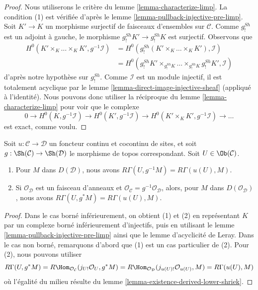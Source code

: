 \begin{proof}
Nous utiliserons le critère du lemme \ref{lemma-characterize-limp}.
La condition (1) est vérifiée d'après le
lemme \ref{lemma-pullback-injective-pre-limp}.
Soit $K' \to K$ un morphisme surjectif de faisceaux d'ensembles sur
$\mathcal{C}$. Comme $g_!^{Sh}$ est un adjoint à gauche, le morphisme
$g_!^{Sh}K' \to g_!^{Sh}K$ est surjectif. Observons que
\begin{align*}
H^0(K' \times_K \ldots \times_K K', g^{-1}\mathcal{I}) 
& =
H^0(g_!^{Sh}(K' \times_K \ldots \times_K K'), \mathcal{I}) \\
& =
H^0(g_!^{Sh}K' \times_{g_!^{Sh}K} \ldots \times_{g_!^{Sh}K} g_!^{Sh}K',
\mathcal{I})
\end{align*}
d'après notre hypothèse sur $g_!^{Sh}$. Comme $\mathcal{I}$ est un module
injectif, il est totalement acyclique par le
lemme \ref{lemma-direct-image-injective-sheaf} (appliqué à l'identité).
Nous pouvons donc utiliser la réciproque du lemme
\ref{lemma-characterize-limp} pour voir que le complexe
$$
0 \to H^0(K, g^{-1}\mathcal{I}) \to H^0(K', g^{-1}\mathcal{I}) \to
H^0(K' \times_K K', g^{-1}\mathcal{I}) \to \ldots
$$
est exact, comme voulu.
\end{proof}

\begin{lemma}
\label{lemma-pullback-same-cohomology}
Soit $u : \mathcal{C} \to \mathcal{D}$ un foncteur continu et cocontinu de
sites, et soit $g : \Sh(\mathcal{C}) \to \Sh(\mathcal{D})$ le morphisme de
topos correspondant. Soit $U \in \Ob(\mathcal{C})$.
\begin{enumerate}
\item Pour $M$ dans $D(\mathcal{D})$, nous avons
$R\Gamma(U, g^{-1}M) = R\Gamma(u(U), M)$.
\item Si $\mathcal{O}_\mathcal{D}$ est un faisceau d'anneaux et
$\mathcal{O}_\mathcal{C} = g^{-1}\mathcal{O}_\mathcal{D}$, alors, pour $M$
dans $D(\mathcal{O}_\mathcal{D})$, nous avons
$R\Gamma(U, g^*M) = R\Gamma(u(U), M)$.
\end{enumerate}
\end{lemma}

\begin{proof}
Dans le cas borné inférieurement, on obtient (1) et (2) en représentant $K$
par un complexe borné inférieurement d'injectifs, puis en utilisant le
lemme \ref{lemma-pullback-injective-pre-limp} ainsi que le lemme d'acyclicité
de Leray. Dans le cas non borné, remarquons d'abord que (1) est un cas
particulier de (2). Pour (2), nous pouvons utiliser
$$
R\Gamma(U, g^*M) =
R\Hom_{\mathcal{O}_\mathcal{C}}(j_{U!}\mathcal{O}_U, g^*M) =
R\Hom_{\mathcal{O}_\mathcal{D}}(j_{u(U)!}\mathcal{O}_{u(U)}, M) =
R\Gamma(u(U), M)
$$
où l'égalité du milieu résulte du
lemme \ref{lemma-existence-derived-lower-shriek}.
\end{proof}

